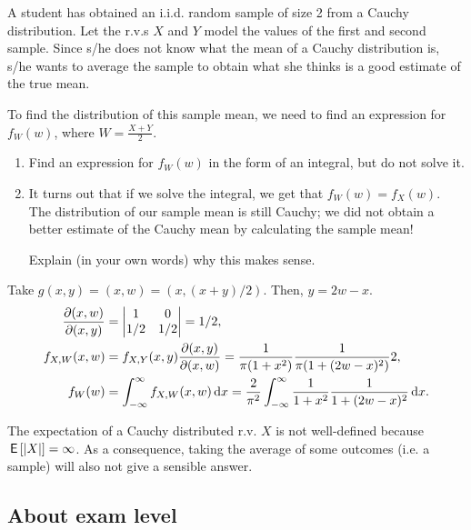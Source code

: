\documentclass[assignments]{subfiles}
\begin{document}
\begin{exercise}
A student has obtained an i.i.d.
random sample of size 2 from a Cauchy distribution. Let the r.v.s $X$ and $Y$ model the  values of the first and second sample.
Since s/he does not know what the mean of a Cauchy distribution is, s/he wants to average the sample to obtain what she thinks is a good estimate of the true mean.

To find the distribution of this sample mean, we need to find an expression for $f_W(w)$, where $W=\frac{X+Y}2$.

\begin{enumerate}
\item Find an expression for $f_W(w)$ in the form of an integral, but do not solve it.
\item It turns out that if we solve the integral, we get that $f_W(w) = f_X(w)$. The distribution of our sample mean is still Cauchy; we did not obtain a better estimate of the Cauchy mean by calculating the sample mean!

Explain (in your own words) why this makes sense.
\end{enumerate}
\begin{solution}
 Take $g(x,y) = (x, w) = (x, (x+y)/2)$. Then, $y=2w -x$.
\begin{align}
\frac{\partial (x,w)}{\partial (x, y)} &=
  \begin{vmatrix}
    1 & 0 \\
1/2 & 1/2
  \end{vmatrix} = 1/2,\\
f_{X,W}(x,w) &= f_{X,Y}(x,y) \frac{\partial(x,y)}{\partial(x,w)} = \frac{1}{\pi(1+x^{2})}\frac{1}{\pi(1+(2w-x)^{2})} 2,\\
f_{W}(w) &= \int_{-\infty}^{\infty} f_{X,W}(x,w) \,\textrm{d}x = \frac{2}{\pi^{2}} \int_{-\infty}^{\infty} \frac{1}{1+x^{2}}\frac{1}{1+(2w-x)^{2}} \,\textrm{d}x.
\end{align}

The expectation of a Cauchy distributed r.v. $X$ is not well-defined because $\,\mathsf{E}\left[|X|\right] = \infty$. As a consequence, taking the average of some outcomes (i.e. a sample) will also not give a sensible answer.
\end{solution}
\end{exercise}






\subsection{About exam level}
\label{sec:chapter-8}
\end{document}
